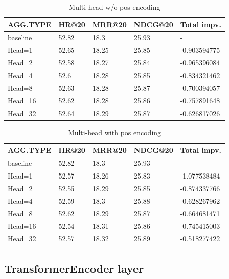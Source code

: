 \documentclass{article}
\begin{document}
\begin{table}
    \caption{Multi-head w/o pos encoding}
    \label{Multi-head w/o pos encoding}
    \centering
    \begin{tabular}{lllll}
        \toprule
        AGG.TYPE & HR@20 & MRR@20 & NDCG@20 & Total impv.  \\
        \midrule
        baseline & 52.82 & 18.3   & 25.93   & -            \\
        Head=1   & 52.65 & 18.25  & 25.85   & -0.903594775 \\
        Head=2   & 52.58 & 18.27  & 25.84   & -0.965396084 \\
        Head=4   & 52.6  & 18.28  & 25.85   & -0.834321462 \\
        Head=8   & 52.63 & 18.28  & 25.87   & -0.700394057 \\
        Head=16  & 52.62 & 18.28  & 25.86   & -0.757891648 \\
        Head=32  & 52.64 & 18.29  & 25.87   & -0.626817026 \\
        \bottomrule
    \end{tabular}
\end{table}

\begin{table}
    \caption{Multi-head with pos encoding}
    \label{Multi-head with pos encoding}
    \centering
    \begin{tabular}{lllll}
        \toprule
        AGG.TYPE & HR@20 & MRR@20 & NDCG@20 & Total impv.  \\
        \midrule
        baseline & 52.82 & 18.3   & 25.93   & -            \\
        Head=1   & 52.57 & 18.26  & 25.83   & -1.077538484 \\
        Head=2   & 52.55 & 18.29  & 25.85   & -0.874337766 \\
        Head=4   & 52.59 & 18.3   & 25.88   & -0.628267962 \\
        Head=8   & 52.62 & 18.29  & 25.87   & -0.664681471 \\
        Head=16  & 52.54 & 18.31  & 25.86   & -0.745415003 \\
        Head=32  & 52.57 & 18.32  & 25.89   & -0.518277422 \\
        \bottomrule
    \end{tabular}
\end{table}

\subsection{TransformerEncoder layer}
\end{document}
